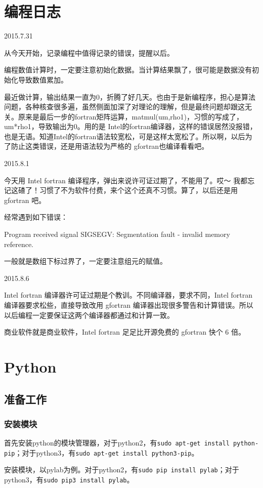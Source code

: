 \chapter{编程日志}
2015.7.31

从今天开始，记录编程中值得记录的错误，提醒以后。

编程数值计算时，一定要注意初始化数据。当计算结果飘了，很可能是数据没有初始化导致数值累加。

最近做计算，输出结果一直为0，折腾了好几天。也由于是新编程序，担心是算法问题，各种核查很多遍，虽然侧面加深了对理论的理解，但是最终问题却跟这无关。原来是最后一步的fortran矩阵运算，matmul(um,rho1)，习惯的写成了，um*rho1，导致输出为0。用的是 Intel的fortran编译器，这样的错误居然没报错，也是无语。知道Intel的fortran语法较宽松，可是这样太宽松了。所以啊，以后为了防止这类错误，还是用语法较为严格的 gfortran也编译看看吧。

2015.8.1

今天用 Intel fortran 编译程序，弹出来说许可证过期了，不能用了。哎～ 我都忘记这碴了！习惯了不为软件付费，来个这个还真不习惯。算了，以后还是用 gfortran 吧。

经常遇到如下错误：

Program received signal SIGSEGV: Segmentation fault - invalid memory reference.

一般就是数组下标过界了，一定要注意组元的赋值。

2015.8.6

Intel fortran 编译器许可证过期是个教训。不同编译器，要求不同，Intel fortran 编译器要求松些，直接导致改用 gfortran 编译器出现很多警告和计算错误。所以以后编程一定要保证这两个编译器都通过和计算一致。

商业软件就是商业软件，Intel fortran 足足比开源免费的 gfortran 快个 6 倍。




\chapter{Python}
\section{准备工作}
\subsection{安装模块}
首先安装python的模块管理器，对于python2，有\verb|sudo apt-get install python-pip|；对于python3，有\verb|sudo apt-get install python3-pip|。

安装模块，以pylab为例。对于python2，有\verb|sudo pip install pylab|；对于python3，有\verb|sudo pip3 install pylab|。

